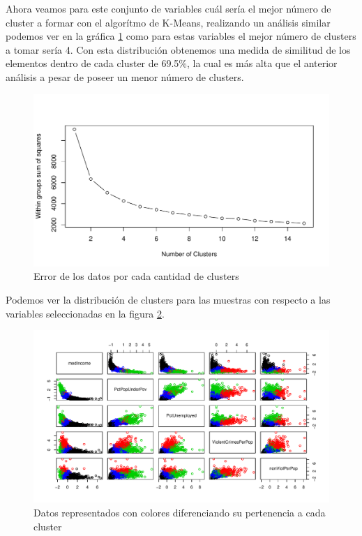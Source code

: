 \documentclass[a4paper,10pt,twocolumn]{article}
\begin{document}
	Ahora veamos para este conjunto de variables cuál sería el mejor número de cluster a formar con el algorítmo de K-Means, realizando un análisis similar podemos ver en la gráfica \ref{fig:cluster_n_2} como para estas variables el mejor número de clusters a tomar sería 4. Con esta distribución obtenemos una medida de similitud de los elementos dentro de cada cluster de 69.5\%, la cual es más alta que el anterior análisis a pesar de poseer un menor número de clusters.

	\begin{figure}[htb]
		\begin{center}
			\includegraphics[width=\columnwidth]{figures/cluster_n_2.pdf}
		\end{center}
		\caption{Error de los datos por cada cantidad de clusters \label{fig:cluster_n_2}}%
	\end{figure}

	Podemos ver la distribución de clusters para las muestras con respecto a las variables seleccionadas en la figura \ref{fig:plot_clusters}.

	\begin{figure}[htb]
		\begin{center}
			\includegraphics[width=\columnwidth]{figures/plot_clusters.pdf}
		\end{center}
		\caption{Datos representados con colores diferenciando su pertenencia a cada cluster \label{fig:plot_clusters}}%
	\end{figure}
\end{document}
